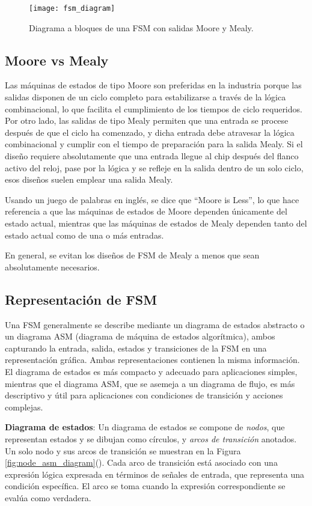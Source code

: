     \begin{figure}[h!]
      \centering
      \texttt{[image: fsm\_diagram]}
      \caption{Diagrama a bloques de una FSM con salidas Moore y Mealy.}
      \label{fig:fsm_diagram}
    \end{figure}

    \subsection{Moore vs Mealy}

    Las máquinas de estados de tipo Moore son preferidas en la industria porque las salidas disponen de un ciclo completo para estabilizarse a través de la lógica combinacional, lo que facilita el cumplimiento de los tiempos de ciclo requeridos. Por otro lado, las salidas de tipo Mealy permiten que una entrada se procese después de que el ciclo ha comenzado, y dicha entrada debe atravesar la lógica combinacional y cumplir con el tiempo de preparación para la salida Mealy. Si el diseño requiere absolutamente que una entrada llegue al chip después del flanco activo del reloj, pase por la lógica y se refleje en la salida dentro de un solo ciclo, esos diseños suelen emplear una salida Mealy.

    Usando un juego de palabras en inglés, se dice que ``Moore is Less'', lo que hace referencia a que las máquinas de estados de Moore dependen únicamente del estado actual, mientras que las máquinas de estados de Mealy dependen tanto del estado actual como de una o más entradas. 

    En general, se evitan los diseños de FSM de Mealy a menos que sean absolutamente necesarios.

    \subsection{Representación de FSM}

    Una FSM generalmente se describe mediante un diagrama de estados abstracto o un diagrama ASM (diagrama de máquina de estados algorítmica), ambos capturando la entrada, salida, estados y transiciones de la FSM en una representación gráfica. Ambas representaciones contienen la misma información. El diagrama de estados es más compacto y adecuado para aplicaciones simples, mientras que el diagrama ASM, que se asemeja a un diagrama de flujo, es más descriptivo y útil para aplicaciones con condiciones de transición y acciones complejas.

    \textbf{Diagrama de estados}: Un diagrama de estados se compone de \textit{nodos}, que representan estados y se dibujan como círculos, y \textit{arcos de transición} anotados. Un solo nodo y sus arcos de transición se muestran en la Figura \ref{fig:node_asm_diagram}(). Cada arco de transición está asociado con una expresión lógica expresada en términos de señales de entrada, que representa una condición específica. El arco se toma cuando la expresión correspondiente se evalúa como verdadera.


